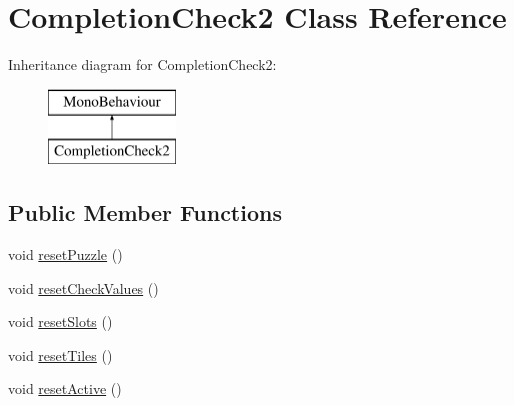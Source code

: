 \hypertarget{class_completion_check2}{}\section{Completion\+Check2 Class Reference}
\label{class_completion_check2}
Inheritance diagram for Completion\+Check2\+:\begin{figure}[H]
\begin{center}
\leavevmode
\includegraphics[height=2.000000cm]{class_completion_check2}
\end{center}
\end{figure}
\subsection*{Public Member Functions}
\begin{DoxyCompactItemize}
\item 
void \hyperlink{class_completion_check2_aa06cef9b95d2f9c4bbb498f6c9efac1e}{reset\+Puzzle} ()
\item 
void \hyperlink{class_completion_check2_ad02e4fa74bc9dfaf00961746a68d7061}{reset\+Check\+Values} ()
\item 
void \hyperlink{class_completion_check2_a35ed56dc84b27430bdacabc119985ec5}{reset\+Slots} ()
\item 
void \hyperlink{class_completion_check2_a16a374ffbff900932f113dad066d27e4}{reset\+Tiles} ()
\item 
void \hyperlink{class_completion_check2_acc81070efa47ed19e94287be80bba5da}{reset\+Active} ()
\end{DoxyCompactItemize}
